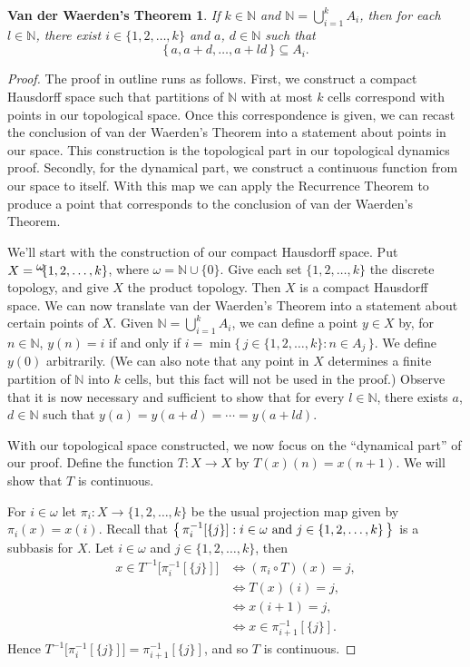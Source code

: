 \documentclass[12pt]{article}
\theoremstyle{plain}
\newtheorem{vdW}[thm]{Van der Waerden's Theorem}
\theoremstyle{definition}
\newcommand{\bbN}{\mathbb{N}}
\newcommand{\setfunc}[2]{\hbox{${}^{\hbox{$#1$}}\hskip -3 pt #2$}}
\begin{document}
  \begin{vdW}
    If $k \in \bbN$ and $\bbN = \bigcup_{i=1}^k A_i$, then for each $l \in
    \bbN$, there exist $i \in \{1, 2, \ldots, k\}$ and $a$, $d \in
    \mathbb{N}$ such that 
      \[
        \{\, a, a+d, \ldots, a+ld \,\} \subseteq A_i.
      \]
  \end{vdW}
  \begin{proof}
    The proof in outline runs as follows.
    First, we construct a compact Hausdorff space such that partitions
    of $\bbN$ with at most $k$ cells correspond with points in our
    topological space. 
    Once this correspondence is given, we can recast the conclusion of
    van der Waerden's Theorem into a statement about points in our
    space. 
    This construction is the topological part in our topological
    dynamics proof.
    Secondly, for the dynamical part, we construct a continuous
    function from our space to itself. 
    With this map we can apply the Recurrence Theorem to produce a
    point that corresponds to the conclusion of van der
    Waerden's Theorem. 

    We'll start with the construction of our compact Hausdorff space. 
    Put $X = \setfunc{\omega}{\{1, 2, \ldots, k \}}$, where $\omega =
    \bbN \cup \{0\}$. 
    Give each set $\{1, 2, \ldots, k\}$ the discrete topology, and give $X$
    the product topology. 
    Then $X$ is a compact Hausdorff space. 
    We can now translate van der Waerden's Theorem into a statement
    about certain points of $X$. 
    Given $\bbN = \bigcup_{i=1}^k A_i$, we can define a point $y \in
    X$ by, for $n \in \bbN$, $y(n) = i$ if and only if $i = \min\bigl\{\, j
    \in \{1, 2, \ldots, k\} : n \in A_j \,\bigr\}$.
    We define $y(0)$ arbitrarily. 
    (We can also note that any point in $X$ determines a finite
    partition of $\bbN$ into $k$ cells, but this fact will not be used 
    in the proof.)
    Observe that it is now necessary and sufficient to show that
    for every $l \in \bbN$, there exists $a$, $d \in \bbN$ such 
    that $y(a) = y(a+d) = \cdots = y(a+ld)$.

    With our topological space constructed, we now focus on the
    ``dynamical part'' of our proof.
    Define the function $T : X \to X$ by $T(x)(n) = x(n+1)$. 
    We will show that $T$ is continuous. 
    
    For $i \in \omega$ let $\pi_i : X \to \{1, 2, \ldots, k\}$ be the
    usual projection map given by $\pi_i(x) = x(i)$. 
    Recall that $\bigl\{\, \pi_i^{-1}[\{j\}] : \hbox{$i \in \omega$ and $j
      \in \{1, 2, \ldots, k\}$} \,\bigr\}$ is a subbasis for $X$. 
    Let $i \in \omega$ and $j \in \{1, 2, \ldots, k\}$, then
      \begin{align*}
        x \in T^{-1}\bigl[\pi_i^{-1}[\{j\}]\bigr] &\iff (\pi_i \circ
        T)(x) = j, \\
        &\iff T(x)(i) = j, \\
        &\iff x(i+1) = j, \\
        &\iff x \in \pi_{i+1}^{-1}[\{j\}].
      \end{align*}
    Hence $T^{-1}\bigl[\pi_i^{-1}[\{j\}]\bigr] =
    \pi_{i+1}^{-1}[\{j\}]$, and so $T$ is continuous. 


\end{proof}
\end{document}
